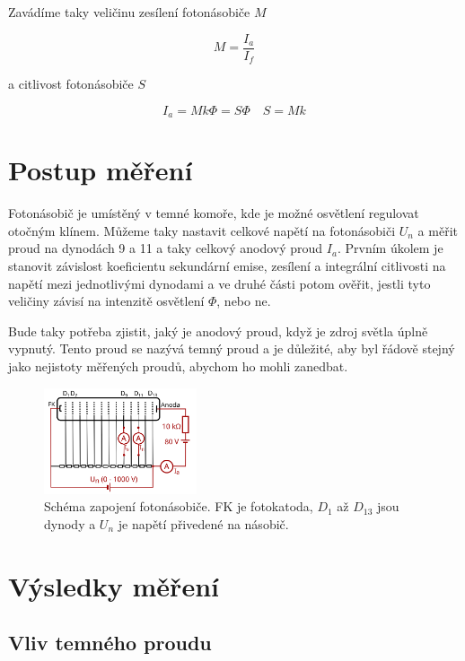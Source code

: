 \documentclass[a4paper,11pt]{article}
\begin{document}
\noindent
Zavádíme taky veličinu zesílení fotonásobiče $ M $ 

\begin{equation}
M = \frac{I_a}{I_f}
\end{equation}

\noindent
a citlivost fotonásobiče $ S $ 

\begin{equation}
I_a = M k \Phi = S \Phi \quad S = M k
\end{equation}

 
\section{Postup měření}

Fotonásobič je umístěný v temné komoře, kde je možné osvětlení regulovat otočným klínem. Můžeme taky nastavit celkové napětí na fotonásobiči $ U_n $ a měřit proud na dynodách 9 a 11 a taky celkový anodový proud $ I_a $.
Prvním úkolem je stanovit závislost koeficientu sekundární emise, zesílení a integrální citlivosti na napětí mezi jednotlivými dynodami a ve druhé části potom ověřit, jestli tyto veličiny závisí na intenzitě osvětlení $ \Phi $, nebo ne.

Bude taky potřeba zjistit, jaký je anodový proud, když je zdroj světla úplně vypnutý. Tento proud se nazývá temný proud a je důležité, aby byl řádově stejný jako nejistoty měřených proudů, abychom ho mohli zanedbat.

\begin{figure}[htpb]
    \centering
    \includegraphics[width=0.4\textwidth]{fotonasobic.png}
    \caption{Schéma zapojení fotonásobiče. FK je fotokatoda, $ D_1 $ až $ D_{13} $ jsou dynody a $ U_n $ je napětí přivedené na násobič. }
\end{figure}

\section{Výsledky měření}

\subsection{Vliv temného proudu}
\end{document}
